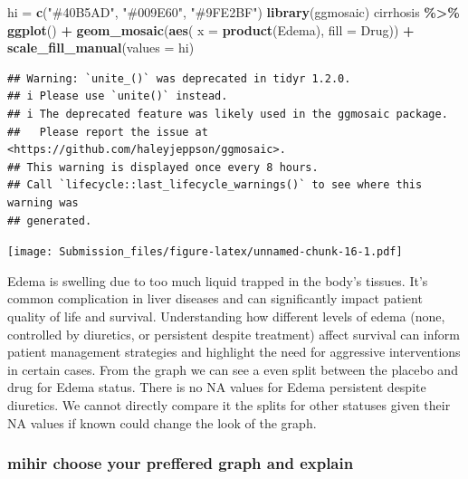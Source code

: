 \documentclass[
]{article}
\newenvironment{Shaded}{\begin{snugshade}}{\end{snugshade}}
\newcommand{\AttributeTok}[1]{\textcolor[rgb]{0.13,0.29,0.53}{#1}}
\newcommand{\FunctionTok}[1]{\textcolor[rgb]{0.13,0.29,0.53}{\textbf{#1}}}
\newcommand{\NormalTok}[1]{#1}
\newcommand{\OtherTok}[1]{\textcolor[rgb]{0.56,0.35,0.01}{#1}}
\newcommand{\SpecialCharTok}[1]{\textcolor[rgb]{0.81,0.36,0.00}{\textbf{#1}}}
\newcommand{\StringTok}[1]{\textcolor[rgb]{0.31,0.60,0.02}{#1}}
\begin{document}
\begin{Shaded}
\begin{Highlighting}[]
\NormalTok{hi }\OtherTok{=} \FunctionTok{c}\NormalTok{(}\StringTok{"\#40B5AD"}\NormalTok{, }\StringTok{"\#009E60"}\NormalTok{, }\StringTok{"\#9FE2BF"}\NormalTok{)}
\FunctionTok{library}\NormalTok{(ggmosaic)}
\NormalTok{cirrhosis }\SpecialCharTok{\%\textgreater{}\%}
  \FunctionTok{ggplot}\NormalTok{() }\SpecialCharTok{+}
  \FunctionTok{geom\_mosaic}\NormalTok{(}\FunctionTok{aes}\NormalTok{( }\AttributeTok{x =} \FunctionTok{product}\NormalTok{(Edema), }\AttributeTok{fill =}\NormalTok{ Drug)) }\SpecialCharTok{+} \FunctionTok{scale\_fill\_manual}\NormalTok{(}\AttributeTok{values =}\NormalTok{ hi)}
\end{Highlighting}
\end{Shaded}

\begin{verbatim}
## Warning: `unite_()` was deprecated in tidyr 1.2.0.
## i Please use `unite()` instead.
## i The deprecated feature was likely used in the ggmosaic package.
##   Please report the issue at <https://github.com/haleyjeppson/ggmosaic>.
## This warning is displayed once every 8 hours.
## Call `lifecycle::last_lifecycle_warnings()` to see where this warning was
## generated.
\end{verbatim}

\texttt{[image: Submission\_files/figure-latex/unnamed-chunk-16-1.pdf]}

Edema is swelling due to too much liquid trapped in the body's tissues.
It's common complication in liver diseases and can significantly impact
patient quality of life and survival. Understanding how different levels
of edema (none, controlled by diuretics, or persistent despite
treatment) affect survival can inform patient management strategies and
highlight the need for aggressive interventions in certain cases. From
the graph we can see a even split between the placebo and drug for Edema
status. There is no NA values for Edema persistent despite diuretics. We
cannot directly compare it the splits for other statuses given their NA
values if known could change the look of the graph.

\hypertarget{mihir-choose-your-preffered-graph-and-explain}{%
\subsubsection{mihir choose your preffered graph and
explain}\label{mihir-choose-your-preffered-graph-and-explain}}
\end{document}
